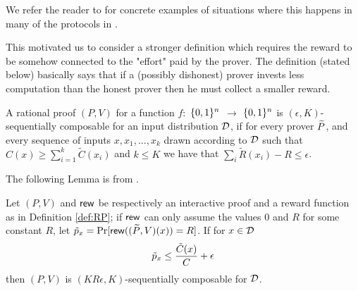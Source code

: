 We refer the reader to \cite{cg15} for concrete examples of situations where this happens in many of the protocols in \cite{am,am1,ratargs,ratsumchecks}.

This motivated us to consider a stronger definition which requires the reward to be 
somehow connected to the "effort" paid by the prover. The definition (stated below) basically says that if a (possibly dishonest) prover invests less computation than the honest prover then he must collect a smaller reward. 

\noindent
\begin{definition}
\label{def:SRP}
A rational proof $(P,V)$ for a function $f:$ $\{0, 1\}^n$ $\to$ 
$\{0, 1\}^n$ is $(\epsilon, K)$-{\sf sequentially composable} for an input distribution $\cal D$, if for every prover $\widetilde{P}$, 
and every sequence of inputs 
$x,x_1,\ldots,x_k$ drawn according to ${\cal D}$ such that $C(x) \geq \sum_{i=1}^k 
\tilde{C}(x_i)$ and $k \leq K$ we have that $\sum_{i}\tilde{R}(x_i) - R \leq \epsilon$.
\end{definition}


The following Lemma is from \cite{cg15}. 

\begin{lemma}
\label{cor:prob}
Let $(P,V)$ and $\mathsf{rew}$ be respectively an interactive proof and a reward 
function as in 
Definition \ref{def:RP}; if $\mathsf{rew}$ can only assume the values $0$ and $R$ for 
some constant $R$, let $\tilde{p}_x = \Pr[\mathsf{rew}((\widetilde{P},V)(x)) = R]$. If for $x \in {\cal D}$
$$  \tilde{p}_x \leq \frac{\tilde{C}(x)}{C} + \epsilon $$
then $(P,V)$ is $(KR\epsilon, K)$-sequentially composable for $\cal D$. 
\end{lemma}

